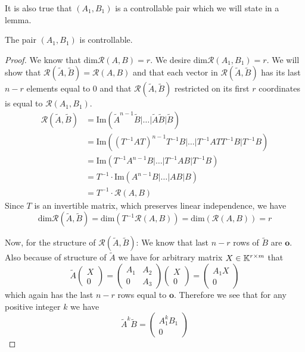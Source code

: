 It is also true that $(A_1,B_1)$ is a controllable pair which we will state in a lemma.

\begin{lemma}
	The pair $(A_1,B_1)$ is controllable.
\end{lemma}

\begin{proof}
	We know that $\text{dim}\mathcal{R}(A,B)=r$. We desire $\text{dim}\mathcal{R}(A_1,B_1)=r$. We will show that $\mathcal{R}(\widetilde{A},\widetilde{B})=\mathcal{R}(A,B)$ and that each vector in $\mathcal{R}(\widetilde{A},\widetilde{B})$ has its last $n-r$ elements equal to 0 and that $\mathcal{R}(\widetilde{A},\widetilde{B})$ restricted on its first $r$ coordinates is equal to $\mathcal{R}(A_1,B_1)$. 
	\begin{align*}
		\mathcal{R}(\widetilde{A},\widetilde{B})&=\text{Im}(\widetilde{A}^{n-1}\widetilde{B}|\ldots|\widetilde{A}\widetilde{B}|\widetilde{B}) \\
		&=\text{Im}((T^{-1}AT)^{n-1}T^{-1}B|\ldots|T^{-1}ATT^{-1}B|T^{-1}B) \\
		&=\text{Im}(T^{-1}A^{n-1}B|\ldots|T^{-1}AB|T^{-1}B) \\
		&=T^{-1}\cdot\text{Im}(A^{n-1}B|\ldots|AB|B) \\
		&=T^{-1}\cdot\mathcal{R}(A,B)
	\end{align*}
	Since $T$ is an invertible matrix, which preserves linear independence, we have $$\text{dim}\mathcal{R}(\widetilde{A},\widetilde{B})=\text{dim}(T^{-1}\mathcal{R}(A,B))=\text{dim}(\mathcal{R}(A,B))=r$$

	Now, for the structure of $\mathcal{R}(\widetilde{A},\widetilde{B})$: We know that last $n-r$ rows of $\widetilde{B}$ are $\textbf{o}$. Also because of structure of $\widetilde{A}$ we have for arbitrary matrix $X\in\mathbb{K}^{r\times m}$ that 
	\begin{equation*}
		\widetilde{A}
		\begin{pmatrix}
			X \\
			0
		\end{pmatrix}
		=
		\begin{pmatrix}
			A_1 & A_2 \\
			  0 & A_3
		\end{pmatrix}
		\begin{pmatrix}
			X \\
			0
		\end{pmatrix}
		=
		\begin{pmatrix}
			A_1X \\
			0
		\end{pmatrix}
	\end{equation*}
	which again has the last $n-r$ rows equal to $\textbf{o}$. Therefore we see that for any positive integer $k$ we have 
	\begin{equation*}
		\widetilde{A}^k\widetilde{B}=
		\begin{pmatrix}
			A_1^{k}B_1 \\
			0
		\end{pmatrix}
	\end{equation*}
	

\end{proof}
